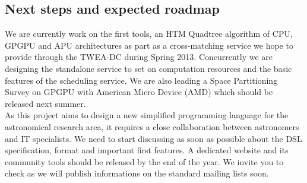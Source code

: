 \documentclass[11pt, twoside]{article}
\begin{document}
		\subsection{Next steps and expected roadmap}
			We are currently work on the first tools, an HTM Quadtree algorithm of CPU, GPGPU and APU architectures as part as a cross-matching service we hope to provide through the TWEA-DC during Spring 2013.
			Concurrently we are designing the standalone service to set on computation resources and the basic features of the scheduling service.
			We are also leading a Space Partitioning Survey on GPGPU with American Micro Device (AMD) which should be released next summer.
			\\
			As this project aims to design a new simplified programming language for the astronomical research area, it requires a close collaboration between astronomers and IT specialists.
			We need to start discussing as soon as possible about the DSL specification, format and important first features.
			A dedicated website and its community tools should be released by the end of the year.
			We invite you to check as we will publish informations on the standard mailing lists soon.


\end{document}
